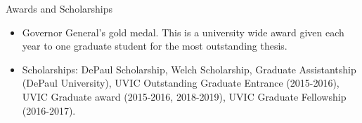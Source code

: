\documentclass{resume} %
\begin{document}
\begin{rSection}{Awards and Scholarships}

\begin{itemize}
	\item 
	Governor General's gold medal. This is a university wide award given each year to one graduate student for the most outstanding thesis.
	
	\item
	Scholarships: DePaul Scholarship, Welch Scholarship, Graduate Assistantship (DePaul University), UVIC Outstanding Graduate Entrance (2015-2016), UVIC Graduate award (2015-2016, 2018-2019), UVIC Graduate Fellowship (2016-2017).
\end{itemize}

\end{rSection}
\end{document}
